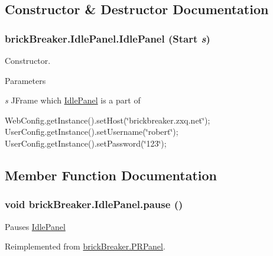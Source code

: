 \subsection{Constructor \& Destructor Documentation}
\hypertarget{classbrick_breaker_1_1_idle_panel_ab4ba4ca56923da71a415ca965a07b0dd}{
\subsubsection[{IdlePanel}]{\setlength{\rightskip}{0pt plus 5cm}brickBreaker.IdlePanel.IdlePanel ({\bf Start} {\em s})}}
\label{classbrick_breaker_1_1_idle_panel_ab4ba4ca56923da71a415ca965a07b0dd}
Constructor.


\begin{DoxyParams}{Parameters}
\item[{\em s}]JFrame which \hyperlink{classbrick_breaker_1_1_idle_panel}{IdlePanel} is a part of \end{DoxyParams}


WebConfig.getInstance().setHost(\char`\"{}brickbreaker.zxq.net\char`\"{}); UserConfig.getInstance().setUsername(\char`\"{}robert\char`\"{}); UserConfig.getInstance().setPassword(\char`\"{}123\char`\"{});



\subsection{Member Function Documentation}
\hypertarget{classbrick_breaker_1_1_idle_panel_a42b96627662408932245a672b5fbfaf1}{
\subsubsection[{pause}]{\setlength{\rightskip}{0pt plus 5cm}void brickBreaker.IdlePanel.pause ()}}
\label{classbrick_breaker_1_1_idle_panel_a42b96627662408932245a672b5fbfaf1}
Pauses \hyperlink{classbrick_breaker_1_1_idle_panel}{IdlePanel} 

Reimplemented from \hyperlink{classbrick_breaker_1_1_p_r_panel_a0868e501fc5599973492e6f0c53da920}{brickBreaker.PRPanel}.

